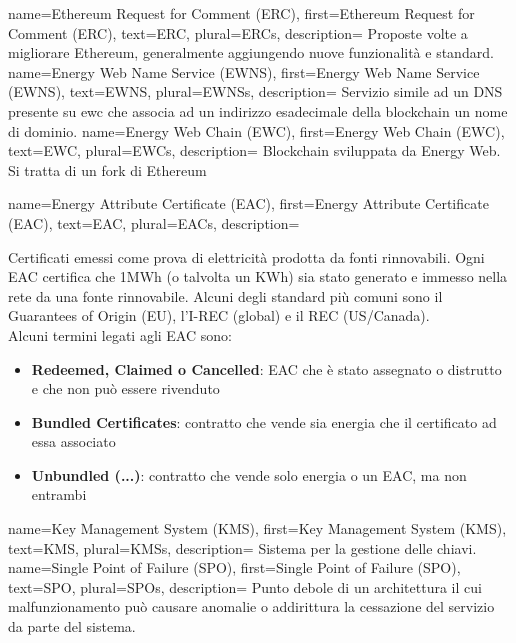 {
    name={Ethereum Request for Comment (ERC)},
    first={Ethereum Request for Comment (ERC)},
    text={ERC},
    plural={ERCs},
    description={
            Proposte volte a migliorare Ethereum, generalmente aggiungendo nuove funzionalità e standard.
        }
}
{
    name={Energy Web Name Service (EWNS)},
    first={Energy Web Name Service (EWNS)},
    text={EWNS},
    plural={EWNSs},
    description={
            Servizio simile ad un DNS presente su \gls{ewc} che associa ad un indirizzo esadecimale della blockchain un nome di dominio.
        }
}
{
    name={Energy Web Chain (EWC)},
    first={Energy Web Chain (EWC)},
    text={EWC},
    plural={EWCs},
    description={
            Blockchain sviluppata da Energy Web. Si tratta di un fork di Ethereum
        }
}
{
    name={Energy Attribute Certificate (EAC)},
    first={Energy Attribute Certificate (EAC)},
    text={EAC},
    plural={EACs},
    description={
            Certificati emessi come prova di elettricità prodotta da fonti rinnovabili.
            Ogni EAC certifica che 1MWh (o talvolta un KWh) sia stato generato e immesso nella rete da una fonte rinnovabile.
            Alcuni degli standard più comuni sono il Guarantees of Origin (EU), l'I-REC (global) e il REC (US/Canada). \\
            Alcuni termini legati agli EAC sono:
            \begin{itemize}
                \item \textbf{Redeemed, Claimed o Cancelled}: EAC che è stato assegnato o distrutto e che non può essere rivenduto
                \item \textbf{Bundled Certificates}: contratto che vende sia energia che il certificato ad essa associato
                \item \textbf{Unbundled (...)}: contratto che vende solo energia o un EAC, ma non entrambi
            \end{itemize}
        }
}
{
    name={Key Management System (KMS)},
    first={Key Management System (KMS)},
    text={KMS},
    plural={KMSs},
    description={
            Sistema per la gestione delle chiavi.
        }
}
{
    name={Single Point of Failure (SPO)},
    first={Single Point of Failure (SPO)},
    text={SPO},
    plural={SPOs},
    description={
            Punto debole di un architettura il cui malfunzionamento può causare anomalie o addirittura la cessazione del servizio da parte del sistema.
        }
}
